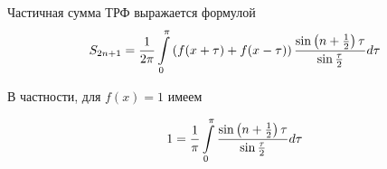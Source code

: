 \begin{utverzhd}
Частичная сумма ТРФ выражается формулой
$$
S_{2n+1} = \frac{1}{2\pi}\int\limits_0^\pi\left(f(x+\tau)+f(x-\tau)\right)\frac{\sin\left(n+\frac{1}{2}\right)\tau}{\sin\frac{\tau}{2}} d\tau
$$
\end{utverzhd}

В частности, для $f(x) = 1$ имеем

$$
1=\frac{1}{\pi}\int\limits_0^\pi\frac{\sin\left(n+\frac{1}{2}\right)\tau}{\sin\frac{\tau}{2}}d\tau
$$
